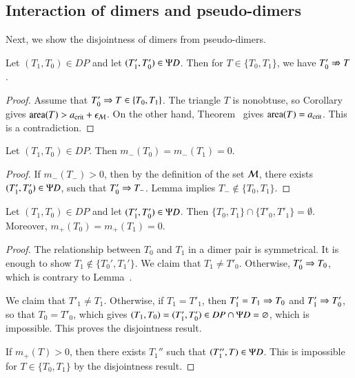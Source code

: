 \subsection{Interaction of dimers and pseudo-dimers}

Next, we show the disjointness of dimers from pseudo-dimers.

\begin{lemma}
  Let $(T_1,T_0)\in DP$ and let $(T'_1,T'_0)\in\Psi D$.  Then for
  $T\in\{T_0,T_1\}$, we have $T'_0\nRightarrow T$.
\end{lemma}

\begin{proof} 
Assume that $T'_0\Rightarrow T\in\{T_0,T_1\}$. The triangle $T$ is
nonobtuse, so Corollary~ gives
${\operatorname{area}}(T)>a_\text{crit}+\epsilon_{\mathcal M}$. On the other hand,
Theorem~ gives ${\operatorname{area}}(T)=a_\text{crit}$.
This is a contradiction.
\end{proof}

\begin{corollary}  
  Let $(T_1,T_0)\in DP$. Then %
  $m_-(T_0)=m_-(T_1)=0$.
\end{corollary}

\begin{proof}  
  If $m_-(T_-)>0$, then by the definition of the set $\mathcal M$, there
  exists $(T_1',T_0')\in \Psi D$, such that $T_0'\Rightarrow T_-$.  %
Lemma  implies $T_-\not\in\{T_0,T_1\}$.
\end{proof}

\begin{lemma}  
  Let $(T_1,T_0)\in DP$ and let $(T'_1,T'_0)\in\Psi D$.  Then
  $\{T_0,T_1\}\cap \{T'_0,T'_1\} = \emptyset$.  Moreover,
  $m_+(T_0) = m_+(T_1)=0$.
\end{lemma}

\begin{proof}
  The relationship between $T_0$ and $T_1$ in a dimer pair is
  symmetrical.  It is enough to show $T_1\not\in\{T_0',T_1'\}$.  We
  claim that $T_1\ne T'_0$.  Otherwise, $T'_0\Rightarrow T_0$, which is
  contrary to Lemma~.

  We claim that $T'_1\ne T_1$.  Otherwise, if $T_1=T'_1$, then
  $T'_1=T_1\Rightarrow T_0$ and $T'_1\Rightarrow T'_0$, so that $T_0 = T'_0$, which
  gives $(T_1,T_0)=(T_1',T_0')\in DP\cap\Psi D=\varnothing$, which is impossible. This proves the disjointness result.

  If $m_+(T) >0$, then there exists $T_1''$ such that $(T_1'',T)\in
  \Psi D$.  This is impossible for $T\in\{T_0,T_1\}$ by the disjointness
  result.
\end{proof}

